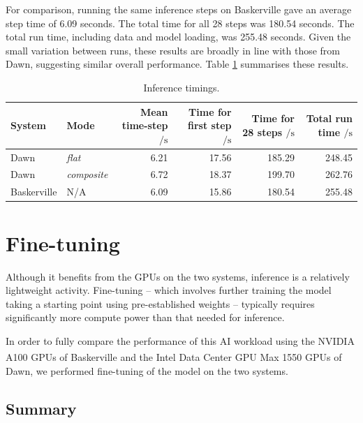 For comparison, running the same inference steps on Baskerville gave an average step time of 6.09 seconds. The total time for all 28 steps was 180.54 seconds. The total run time, including data and model loading, was 255.48 seconds. Given the small variation between runs, these results are broadly in line with those from Dawn, suggesting similar overall performance. Table \ref{tab:inference} summarises these results.

\begin{table}[t] %
    \centering
    \begin{tabular}{@{}llrrrr@{}}
      \toprule
      System
      & Mode
      & \shortstack[r]{Mean\\ time-step ${}/\unit{\second}$}
      & \shortstack[r]{Time for\\ first step ${}/\unit{\second}$}
      & \shortstack[r]{Time for\\ 28 steps ${}/\unit{\second}$}
      & \shortstack[r]{Total\\ run time ${}/\unit{\second}$} \\ \midrule
        Dawn & \textit{flat} & 6.21&  17.56&185.29& 248.45\\
        Dawn & \textit{composite} & 6.72&  18.37&199.70& 262.76\\
        Baskerville & N/A& 6.09&  15.86&180.54& 255.48\\ \bottomrule
    \end{tabular}
    \caption{Inference timings.}
    \label{tab:inference}
\end{table}

\section{Fine-tuning}

Although it benefits from the GPUs on the two systems, inference is a relatively lightweight activity. Fine-tuning -- which involves further training the model taking a starting point using pre-established weights -- typically requires significantly more compute power than that needed for inference.

In order to fully compare the performance of this AI workload using the NVIDIA A100 GPUs of Baskerville and the Intel\textsuperscript{\tiny\textregistered} Data Center GPU Max 1550 GPUs of Dawn, we performed fine-tuning of the model on the two systems.

\subsection{Summary}

